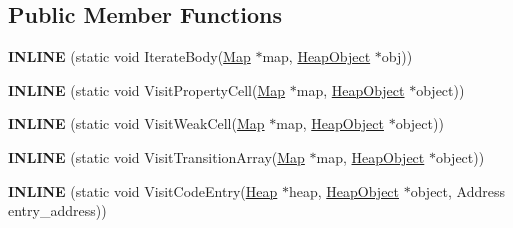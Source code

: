 \subsection*{Public Member Functions}
\begin{DoxyCompactItemize}
\item 
{\bfseries I\+N\+L\+I\+NE} (static void Iterate\+Body(\hyperlink{classv8_1_1internal_1_1_map}{Map} $\ast$map, \hyperlink{classv8_1_1internal_1_1_heap_object}{Heap\+Object} $\ast$obj))\hypertarget{classv8_1_1internal_1_1_static_marking_visitor_a6e69ffa5633ca79464aa40c296740cb6}{}\label{classv8_1_1internal_1_1_static_marking_visitor_a6e69ffa5633ca79464aa40c296740cb6}

\item 
{\bfseries I\+N\+L\+I\+NE} (static void Visit\+Property\+Cell(\hyperlink{classv8_1_1internal_1_1_map}{Map} $\ast$map, \hyperlink{classv8_1_1internal_1_1_heap_object}{Heap\+Object} $\ast$object))\hypertarget{classv8_1_1internal_1_1_static_marking_visitor_a81f58c4cbae570d3e8d1fc871413bf57}{}\label{classv8_1_1internal_1_1_static_marking_visitor_a81f58c4cbae570d3e8d1fc871413bf57}

\item 
{\bfseries I\+N\+L\+I\+NE} (static void Visit\+Weak\+Cell(\hyperlink{classv8_1_1internal_1_1_map}{Map} $\ast$map, \hyperlink{classv8_1_1internal_1_1_heap_object}{Heap\+Object} $\ast$object))\hypertarget{classv8_1_1internal_1_1_static_marking_visitor_aa58c1ab0e77de750f6177cb472962e52}{}\label{classv8_1_1internal_1_1_static_marking_visitor_aa58c1ab0e77de750f6177cb472962e52}

\item 
{\bfseries I\+N\+L\+I\+NE} (static void Visit\+Transition\+Array(\hyperlink{classv8_1_1internal_1_1_map}{Map} $\ast$map, \hyperlink{classv8_1_1internal_1_1_heap_object}{Heap\+Object} $\ast$object))\hypertarget{classv8_1_1internal_1_1_static_marking_visitor_a7a0792bb34aeab9be33529f1660aae99}{}\label{classv8_1_1internal_1_1_static_marking_visitor_a7a0792bb34aeab9be33529f1660aae99}

\item 
{\bfseries I\+N\+L\+I\+NE} (static void Visit\+Code\+Entry(\hyperlink{classv8_1_1internal_1_1_heap}{Heap} $\ast$heap, \hyperlink{classv8_1_1internal_1_1_heap_object}{Heap\+Object} $\ast$object,                                                                                                                                       Address entry\+\_\+address))\hypertarget{classv8_1_1internal_1_1_static_marking_visitor_a836c14259289d79a7853fd87a782abad}{}\label{classv8_1_1internal_1_1_static_marking_visitor_a836c14259289d79a7853fd87a782abad}


\end{DoxyCompactItemize}
